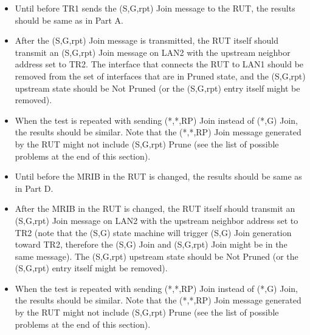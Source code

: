 \documentclass[11pt]{report}
\begin{document}
\begin{itemize}

  \item Until before TR1 sends the (S,G,rpt) Join message to the RUT, the
  results should be same as in Part A.

  \item After the (S,G,rpt) Join message is transmitted, the RUT itself should
  transmit an (S,G,rpt) Join message on LAN2 with the upstream neighbor
  address set to TR2. The interface that connects the RUT to LAN1 should be
  removed from the set of interfaces that are in Pruned state, and the
  (S,G,rpt) upstream state should be Not Pruned (or the (S,G,rpt) entry itself
  might be removed).

  \item When the test is repeated with sending (*,*,RP) Join instead of (*,G)
  Join, the results should be similar.
  Note that the (*,*,RP) Join message generated by the RUT might not include
  (S,G,rpt) Prune (see the list of possible problems at the end of this
  section).

\end{itemize}


\begin{itemize}

  \item Until before the MRIB in the RUT is changed, the results should be
  same as in Part D. 

  \item After the MRIB in the RUT is changed, the RUT itself
  should transmit an (S,G,rpt) Join message on LAN2 with the upstream neighbor
  address set to TR2 (note that the (S,G) state machine will trigger (S,G)
  Join generation toward TR2, therefore the (S,G) Join and (S,G,rpt) Join
  might be in the same message). The (S,G,rpt) upstream state should be Not
  Pruned (or the (S,G,rpt) entry itself might be removed).

  \item When the test is repeated with sending (*,*,RP) Join instead of (*,G)
  Join, the results should be similar.
  Note that the (*,*,RP) Join message generated by the RUT might not include
  (S,G,rpt) Prune (see the list of possible problems at the end of this
  section).

\end{itemize}
\end{document}
